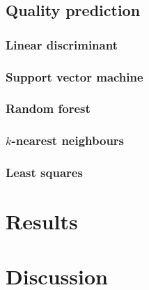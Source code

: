 \documentclass[twoside]{article}
\begin{document}
\begin{multicols}{2}
\subsection{Quality prediction}

\subsubsection{Linear discriminant}

\subsubsection{Support vector machine}

\subsubsection{Random forest}

\subsubsection{$k$-nearest neighbours}

\subsubsection{Least squares}



\section{Results}



\section{Discussion}



\end{multicols}
\end{document}
